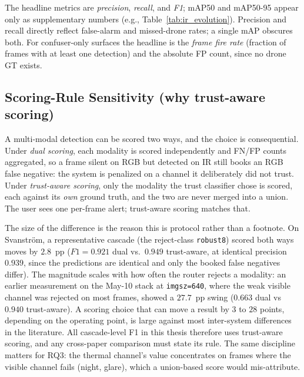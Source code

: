 The headline metrics are \emph{precision}, \emph{recall}, and \emph{F1}; mAP50 and mAP50-95 appear only as supplementary numbers (e.g., Table~\ref{tab:ir_evolution}). Precision and recall directly reflect false-alarm and missed-drone rates; a single mAP obscures both. For confuser-only surfaces the headline is the \emph{frame fire rate} (fraction of frames with at least one detection) and the absolute FP count, since no drone GT exists.

\subsection{Scoring-Rule Sensitivity (why trust-aware scoring)}
\label{sec:scoring_audit}

A multi-modal detection can be scored two ways, and the choice is consequential. Under \emph{dual scoring}, each modality is scored independently and FN/FP counts aggregated, so a frame silent on RGB but detected on IR still books an RGB false negative: the system is penalized on a channel it deliberately did not trust. Under \emph{trust-aware scoring}, only the modality the trust classifier chose is scored, each against its \emph{own} ground truth, and the two are never merged into a union. The user sees one per-frame alert; trust-aware scoring matches that.

The size of the difference is the reason this is protocol rather than a footnote. On Svanstr\"om, a representative cascade (the reject-class \texttt{robust8}) scored both ways moves by $2.8$~pp ($F1=0.921$ dual vs.\ $0.949$ trust-aware, at identical precision $0.939$, since the predictions are identical and only the booked false negatives differ). The magnitude scales with how often the router rejects a modality: an earlier measurement on the May-10 stack at \texttt{imgsz=640}, where the weak visible channel was rejected on most frames, showed a $27.7$~pp swing ($0.663$ dual vs $0.940$ trust-aware). A scoring choice that can move a result by $3$ to $28$ points, depending on the operating point, is large against most inter-system differences in the literature. All cascade-level F1 in this thesis therefore uses trust-aware scoring, and any cross-paper comparison must state its rule. The same discipline matters for RQ3: the thermal channel's value concentrates on frames where the visible channel fails (night, glare), which a union-based score would mis-attribute.

